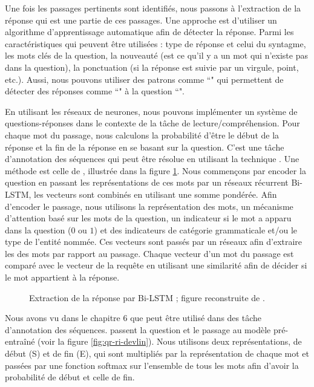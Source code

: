 \documentclass{KodeBook}
\begin{document}
Une fois les passages pertinents sont identifiés, nous passons à l'extraction de la réponse qui est une partie de ces passages. 
Une approche est d'utiliser un algorithme d'apprentissage automatique afin de détecter la réponse. 
Parmi les caractéristiques qui peuvent être utilisées : type de réponse et celui du syntagme, les mots clés de la question, la nouveauté (est ce qu'il y a un mot qui n'existe pas dans la question), la ponctuation (si la réponse est suivie par un virgule, point, etc.). 
Aussi, nous pouvons utiliser des patrons comme ``" qui permettent de détecter des réponses comme ``" à la question ``".


En utilisant les réseaux de neurones, nous pouvons implémenter un système de questions-réponses dans le contexte de la tâche de lecture/compréhension. 
Pour chaque mot du passage, nous calculons la probabilité d'être le début de la réponse et la fin de la réponse en se basant sur la question. 
C'est une tâche d'annotation des séquences qui peut être résolue en utilisant la technique .
Une méthode est celle de \citet{2017-chen-al}, illustrée dans la figure \ref{fig:qr-ri-chen}. 
Nous commençons par encoder la question en passant les représentations  de ces mots par un réseaux récurrent Bi-LSTM, les vecteurs sont combinés en utilisant une somme pondérée. 
Afin d'encoder le passage, nous utilisons la représentation  des mots, un mécanisme d'attention basé sur les mots de la question, un indicateur si le mot a apparu dans la question ($0$ ou $1$) et des indicateurs de catégorie grammaticale et/ou le type de l'entité nommée.
Ces vecteurs sont passés par un réseaux  afin d'extraire les  des mots par rapport au passage. 
Chaque vecteur d'un mot du passage est comparé avec le vecteur de la requête en utilisant une similarité afin de décider si le mot appartient à la réponse.

\begin{figure}[ht]
	\centering
	\caption[Extraction de la réponse par Bi-LSTM.]{Extraction de la réponse par Bi-LSTM ; figure reconstruite de \cite{2019-jurafsky-martin}.}
	\label{fig:qr-ri-chen}
\end{figure}

Nous avons vu dans le chapitre 6 que  peut être utilisé dans des tâche d'annotation des séquences.
\citet{2018-devlin-al} passent la question et le passage au modèle pré-entraîné  (voir la figure \ref{fig:qr-ri-devlin}).
Nous utilisons deux représentations, de début (S) et de fin (E), qui sont multipliés par la représentation de chaque mot et passées par une fonction softmax sur l'ensemble de tous les mots afin d'avoir la probabilité de début et celle de fin.
\end{document}
